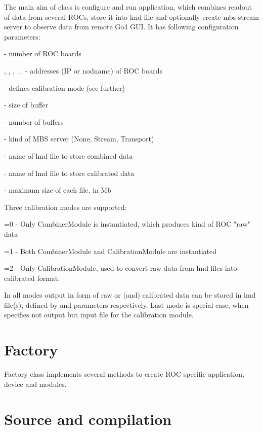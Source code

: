 The main aim of  class is configure and run application,
which combines readout of data from several ROCs, store it into lmd file and optionally 
create mbs stream server to observe data from remote Go4 GUI.
It has following configuration parameters:

\bbul
\item {}   - number of ROC boards  
\item {}, , , ... - addresses (IP or nodname) of ROC boards
\item {}  - defines calibration mode (see further)
\item {} - size of buffer
\item {} - number of buffers
\item {} - kind of MBS server (None, Stream, Transport)
\item {} - name of lmd file to store combined data
\item {} - name of lmd file to store calibrated data
\item {} - maximum size of each file, in Mb
\ebul

Three calibration modes are supported:
\bbul
\item {}=0 - Only CombinerModule is instantiated, which produces kind of ROC "raw" data 
\item {}=1 - Both CombinerModule and CalibrationModule are instantiated   
\item {}=2 - Only CalibrationModule, used to convert raw data from lmd files into calibrated format.
\ebul

In all modes output in form of raw or (and) calibrated data can be stored in lmd file(s),
defined by  and  parameters respectively. Last mode is special case,
when  specifies not output but input file for the calibration module.


\section{Factory}

Factory class  implements several methods to create
ROC-specific application, device and modules.    


\section{Source and compilation}


